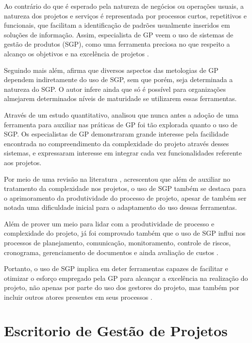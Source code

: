 Ao contrário do que é esperado pela natureza de negócios ou operações usuais, a natureza dos projetos e serviços é representada por processos curtos, repetitivos e funcionais, que facilitam a identificação de padrões usualmente inseridos em soluções de informação. Assim, especialista de GP veem o uso de sistemas de gestão de produtos (SGP), como uma ferramenta preciosa no que respeito a alcanço os objetivos e na excelência de projetos \cite{cserban2011project}.

Seguindo mais além,  afirma que diversos aspectos das metologias de GP dependem indiretamente do uso de SGP, sem que porém, seja determinada a natureza do SGP. O autor infere ainda que só é possível para organizações almejarem determinados níveis de maturidade se utilizarem essas ferramentas.

Através de um estudo quantitativo,  analisou que nunca antes a adoção de uma ferramenta para auxiliar nas práticas de GP foi tão explorada quanto o uso de SGP. Os especialistas de GP demonstraram grande interesse pela facilidade encontrada no compreendimento da complexidade do projeto através desses sistemas, e expressaram interesse em integrar cada vez funcionalidades referente aos projetos.

Por meio de uma revisão na literatura , acrescentou que além de auxiliar no tratamento da complexidade nos projetos, o uso de SGP também se destaca para o aprimoramento da produtividade do processo de projeto, apesar de também ser notada uma dificuldade inicial para o adaptamento do uso dessas ferramentas.

Além de prover um meio para lidar com a produtividade de processo e complexidade do projeto, já foi comprovado também que o uso de SGP influi nos processos de planejamento, comunicação, monitoramento, controle de riscos, cronograma, gerenciamento de documentos e ainda avaliação de custos \cite{raymond2008project}.

Portanto, o uso de SGP implica em deter ferramentas capazes de facilitar e otimizar o esforço empregado pela GP para alcançar a excelência na realização do projeto, não apenas por parte do uso dos gestores do projeto, mas também por incluir outros atores presentes em seus processos \cite{cserban2011project}.


\section{Escritorio de Gestão de Projetos}


